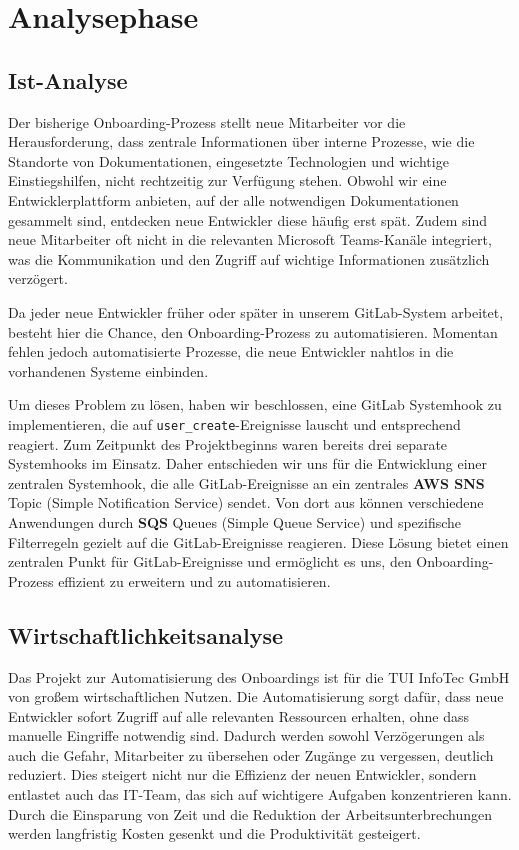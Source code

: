 
\section{Analysephase}
\label{sec:Analysephase}

\subsection{Ist-Analyse}
\label{sec:IstAnalyse}

Der bisherige Onboarding-Prozess stellt neue Mitarbeiter vor die Herausforderung, dass zentrale Informationen über interne Prozesse, wie die Standorte von Dokumentationen, eingesetzte Technologien und wichtige Einstiegshilfen, nicht rechtzeitig zur Verfügung stehen. Obwohl wir eine Entwicklerplattform anbieten, auf der alle notwendigen Dokumentationen gesammelt sind, entdecken neue Entwickler diese häufig erst spät. Zudem sind neue Mitarbeiter oft nicht in die relevanten Microsoft Teams-Kanäle integriert, was die Kommunikation und den Zugriff auf wichtige Informationen zusätzlich verzögert.

Da jeder neue Entwickler früher oder später in unserem GitLab-System arbeitet, besteht hier die Chance, den Onboarding-Prozess zu automatisieren. Momentan fehlen jedoch automatisierte Prozesse, die neue Entwickler nahtlos in die vorhandenen Systeme einbinden.

Um dieses Problem zu lösen, haben wir beschlossen, eine GitLab Systemhook zu implementieren, die auf \texttt{user\_create}-Ereignisse lauscht und entsprechend reagiert. Zum Zeitpunkt des Projektbeginns waren bereits drei separate Systemhooks im Einsatz. Daher entschieden wir uns für die Entwicklung einer zentralen Systemhook, die alle GitLab-Ereignisse an ein zentrales \textbf{AWS SNS} Topic (Simple Notification Service) sendet. Von dort aus können verschiedene Anwendungen durch \textbf{SQS} Queues (Simple Queue Service) und spezifische Filterregeln gezielt auf die GitLab-Ereignisse reagieren. Diese Lösung bietet einen zentralen Punkt für GitLab-Ereignisse und ermöglicht es uns, den Onboarding-Prozess effizient zu erweitern und zu automatisieren.

\subsection{Wirtschaftlichkeitsanalyse}
\label{sec:Wirtschaftlichkeitsanalyse}

Das Projekt zur Automatisierung des Onboardings ist für die \ac{TUI} InfoTec GmbH von großem wirtschaftlichen Nutzen. Die Automatisierung sorgt dafür, dass neue Entwickler sofort Zugriff auf alle relevanten Ressourcen erhalten, ohne dass manuelle Eingriffe notwendig sind. Dadurch werden sowohl Verzögerungen als auch die Gefahr, Mitarbeiter zu übersehen oder Zugänge zu vergessen, deutlich reduziert. Dies steigert nicht nur die Effizienz der neuen Entwickler, sondern entlastet auch das IT-Team, das sich auf wichtigere Aufgaben konzentrieren kann. Durch die Einsparung von Zeit und die Reduktion der Arbeitsunterbrechungen werden langfristig Kosten gesenkt und die Produktivität gesteigert.

